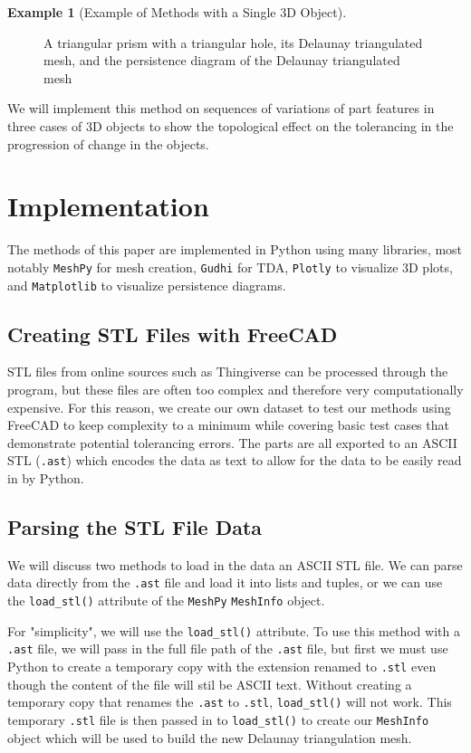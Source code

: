 \documentclass[ma]{uncgdissertationexp}
\theoremstyle{plain}
\theoremstyle{definition}
\newtheorem{example}[theorem]{Example}
\theoremstyle{remark}
\begin{document}
\begin{example}[Example of Methods with a Single 3D Object]
\begin{figure}[H]
\begin{subfigure}[b]{0.3\textwidth}
        \caption{}
        \label{fig:persdia_of_stl}
    \end{subfigure}
    \caption{A triangular prism with a triangular hole, its Delaunay triangulated mesh, and the persistence diagram of the Delaunay triangulated mesh}
    \label{fig:image_data_persdia}
\end{figure}
\noindent We will implement this method on sequences of variations of part features in three cases of 3D objects to show the topological effect on the tolerancing in the progression of change in the objects.
\end{example}

\section{Implementation}

\par The methods of this paper are implemented in Python using many libraries, most notably \verb"MeshPy" for mesh creation, \verb"Gudhi" for TDA, \verb"Plotly" to visualize 3D plots, and \verb"Matplotlib" to visualize persistence diagrams.

\subsection{Creating STL Files with FreeCAD}
\par STL files from online sources such as Thingiverse can be processed through the program, but these files are often too complex and therefore very computationally expensive. For this reason, we create our own dataset to test our methods using FreeCAD to keep complexity to a minimum while covering basic test cases that demonstrate potential tolerancing errors. The parts are all exported to an ASCII STL (\verb".ast") which encodes the data as text to allow for the data to be easily read in by Python.

\subsection{Parsing the STL File Data}
\par We will discuss two methods to load in the data an ASCII STL file. We can parse data directly from the \verb".ast" file and load it into lists and tuples, or we can use the \verb"load_stl()" attribute of the \verb"MeshPy" \verb"MeshInfo" object.

\par For "simplicity", we will use the \verb"load_stl()" attribute. To use this method with a \verb".ast" file, we will pass in the full file path of the \verb".ast" file, but first we must use Python to create a temporary copy with the extension renamed to \verb".stl" even though the content of the file will stil be ASCII text. Without creating a temporary copy that renames the \verb".ast" to \verb".stl", \verb"load_stl()" will not work. This temporary \verb".stl" file is then passed in to \verb"load_stl()" to create our \verb"MeshInfo" object which will be used to build the new Delaunay triangulation mesh.
\end{document}
